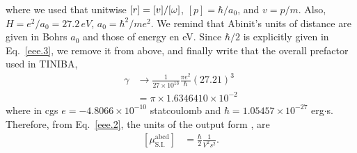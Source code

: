 \documentclass[floatfix,prb,aps,superscriptaddress,11pt]{revtex4}
\begin{document}
where we used that unitwise $[r]=[v]/[\omega]$, $[p]=\hbar/a_0$, and $v=p/m$.
Also, $H=e^2/a_0=27.2\,eV$, $a_0=\hbar^2/me^2$. We remind that Abinit\Reg's 
units of distance are given in Bohrs $a_0$ and those of energy en eV.
Since $\hbar/2$ is explicitly given in Eq.~\eqref{eee.3}, we remove it
from above, and finally write that 
the overall prefactor used in TINIBA\Reg,
\begin{align}\label{eee.5}
\gamma&\to
\frac{1}{27\times 10^{13}}
\frac{\pi e^2}{\hbar}(27.21)^3 
\nonumber\\
&=\pi\times 1.6346410\times 10^{-2}
\end{align}
where in cgs
$e=-4.8066\times 10^{-10}$ statcoulomb and $\hbar=1.05457\times 
10^{-27}$ erg$\cdot$s.
Therefore, from Eq.~\eqref{eee.2}, the units of the output form \tiniba, are
\begin{align}\label{eee.6}
[\mu^{\mathrm{abcd}}_{\mathrm{S.I.}}]&=
\frac{\hbar}{2} \frac{1}{V^2s^2}. 
\end{align} 


{}
\end{document}
